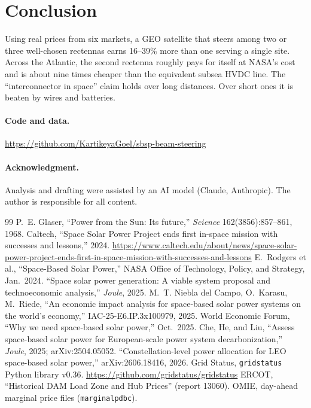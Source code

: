\documentclass[11pt]{article}
\begin{document}
\section{Conclusion}
Using real prices from six markets, a GEO satellite that steers among two or three well-chosen rectennas earns 16--39\% more
than one serving a single site. Across the Atlantic, the second rectenna roughly pays for itself at NASA's cost and is about
nine times cheaper than the equivalent subsea HVDC line. The ``interconnector in space'' claim holds over long distances.
Over short ones it is beaten by wires and batteries.

\paragraph{Code and data.} \url{https://github.com/KartikeyaGoel/sbsp-beam-steering}

\paragraph{Acknowledgment.} Analysis and drafting were assisted by an AI model (Claude, Anthropic). The author is
responsible for all content.

\begin{thebibliography}{99}\small
{} P.~E. Glaser, ``Power from the Sun: Its future,'' \emph{Science} 162(3856):857--861, 1968.
 Caltech, ``Space Solar Power Project ends first in-space mission with successes and lessons,'' 2024.
\url{https://www.caltech.edu/about/news/space-solar-power-project-ends-first-in-space-mission-with-successes-and-lessons}
 E.~Rodgers et al., ``Space-Based Solar Power,'' NASA Office of Technology, Policy, and Strategy, Jan.\ 2024.
 ``Space solar power generation: A viable system proposal and technoeconomic analysis,'' \emph{Joule}, 2025.
 M.~T. Niebla del Campo, O.~Karasu, M.~Riede, ``An economic impact analysis for space-based solar power systems on the world's economy,'' IAC-25-E6.IP.3x100979, 2025.
 World Economic Forum, ``Why we need space-based solar power,'' Oct.\ 2025.
 Che, He, and Liu, ``Assess space-based solar power for European-scale power system decarbonization,'' \emph{Joule}, 2025; arXiv:2504.05052.
 ``Constellation-level power allocation for LEO space-based solar power,'' arXiv:2606.18416, 2026.
 Grid Status, \texttt{gridstatus} Python library v0.36. \url{https://github.com/gridstatus/gridstatus}
 ERCOT, ``Historical DAM Load Zone and Hub Prices'' (report 13060).
 OMIE, day-ahead marginal price files (\texttt{marginalpdbc}).
\end{thebibliography}
\end{document}
